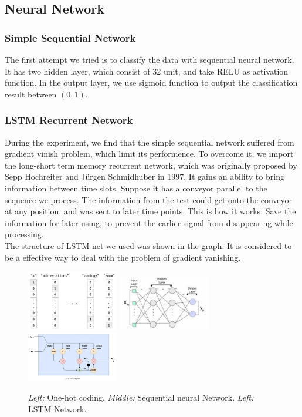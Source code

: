 \documentclass{article}
\begin{document}
\subsection{Neural Network}
\subsubsection{Simple Sequential Network}
The first attempt we tried is to classify the data with sequential neural network. It has two hidden layer, which consist of 32 unit, and take RELU as activation function. In the output layer, we use sigmoid function to output the classification result between $(0,1)$.
\subsubsection{LSTM Recurrent Network}
During the experiment, we find that the simple sequential network suffered from gradient vinish problem, which limit its performence. To overcome it, we import the long-short term memory recurrent network, which was originally proposed by Sepp Hochreiter and Jürgen Schmidhuber in 1997. It gains an ability to bring information between time slots. Suppose it has a conveyor parallel to the sequence we process. The information from the test could get onto the conveyor at any position, and was sent to later time points. This is how it works: Save the information for later using, to prevent the earlier signal from disappearing while processing.\\
The structure of LSTM net we used was shown in the graph. It is considered to be a effective way to deal with the problem of gradient vanishing.

\begin{figure}[h]
	\centering
	\includegraphics[width=4cm]{fig/oneHot.jpg}
	\includegraphics[width=4cm]{fig/snn.jpg}
	\includegraphics[width=4cm]{fig/lstm.jpg}
	\caption{\emph{Left:} One-hot coding. \emph{Middle:} Sequential neural Network. \emph{Left:} LSTM Network.}
	\label{fig:result1}
\end{figure}
\end{document}
